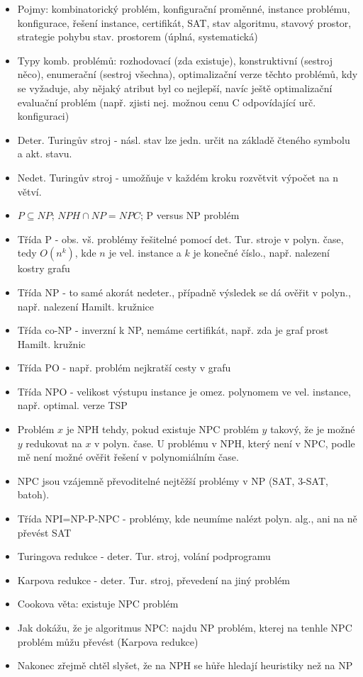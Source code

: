 \documentclass[a4paper,hidelinks]{article}
\begin{document}
\begin{itemize}
    \item Pojmy: kombinatorický problém, konfigurační proměnné, instance problému, konfigurace, řešení instance, certifikát, SAT, stav algoritmu, stavový prostor, strategie pohybu stav. prostorem (úplná, systematická)
    \item Typy komb. problémů: rozhodovací (zda existuje), konstruktivní (sestroj něco), enumerační (sestroj všechna), optimalizační verze těchto problémů, kdy se vyžaduje, aby nějaký atribut byl co nejlepší, navíc ještě optimalizační evaluační problém (např. zjisti nej. možnou cenu C odpovídající urč. konfiguraci)
    \item Deter. Turingův stroj - násl. stav lze jedn. určit na základě čteného symbolu a akt. stavu.
    \item Nedet. Turingův stroj - umožňuje v každém kroku rozvětvit výpočet na n větví.
    \item $P \subseteq NP$; $NPH \cap NP=NPC$; P versus NP problém
    \item Třída P - obs. vš. problémy řešitelné pomocí det. Tur. stroje v polyn. čase, tedy $O(n^k)$, kde $n$ je vel. instance a $k$ je konečné číslo., např. nalezení kostry grafu
    \item Třída NP - to samé akorát nedeter., případně výsledek se dá ověřit v polyn., např. nalezení Hamilt. kružnice
    \item Třída co-NP - inverzní k NP, nemáme certifikát, např. zda je graf prost Hamilt. kružnic
    \item Třída PO - např. problém nejkratší cesty v grafu
    \item Třída NPO - velikost výstupu instance je omez. polynomem ve vel. instance, např. optimal. verze TSP
    \item Problém $x$ je NPH tehdy, pokud existuje NPC problém $y$ takový, že je možné $y$ redukovat na $x$ v polyn. čase. U problému v NPH, který není v NPC, podle mě není možné ověřit řešení v polynomiálním čase.
    \item NPC jsou vzájemně převoditelné nejtěžší problémy v NP (SAT, 3-SAT, batoh).
    \item Třída NPI=NP-P-NPC - problémy, kde neumíme nalézt polyn. alg., ani na ně převést SAT
    \item Turingova redukce - deter. Tur. stroj, volání podprogramu
    \item Karpova redukce - deter. Tur. stroj, převedení na jiný problém
    \item Cookova věta: existuje NPC problém
    \item Jak dokážu, že je algoritmus NPC: najdu NP problém, kterej na tenhle NPC problém můžu převést (Karpova redukce)
    \item Nakonec zřejmě chtěl slyšet, že na NPH se hůře hledají heuristiky než na NP
\end{itemize}
\end{document}
